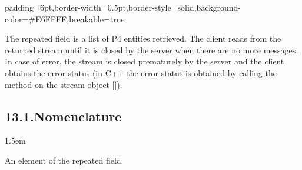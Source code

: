 \documentclass[11pt]{article}
\begin{document}
{%
\begin{mdbmargintb}{6pt}{6pt}%
\begin{mdblock}{padding=6pt,border-width=0.5pt,border-style=solid,background-color=\#E6FFFF,breakable=true}%
\begin{mdpre}%
\end{mdpre}%
\end{mdblock}%
\end{mdbmargintb}%

\noindent{}The  repeated field is a list of P4 entities retrieved. The client
reads from the returned stream until it is closed by the server when there are
no more messages. In case of error, the stream is closed prematurely by the
server and the client obtains the error status (in C++ the error status is
obtained by calling the  method on the stream object
[]).%

\subsection{13.1.\hspace*{0.5em}Nomenclature}\label{sec-nomenclature}%

\begin{mddefinitions}%


\begin{mdbmarginx}{}{}{}{1.5em}%
\begin{mddefdata}%
An element of the  repeated field.
\end{mddefdata}%
\end{mdbmarginx}%


\end{mddefinitions}}
\end{document}
